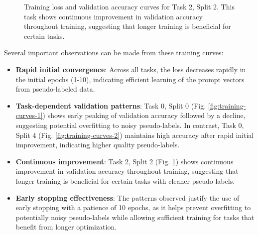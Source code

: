 \documentclass[10pt,conference]{IEEEtran}
\begin{document}
\begin{figure}[!t]
\centering
{}
\caption{Training loss and validation accuracy curves for Task 2, Split 2. This task shows continuous improvement in validation accuracy throughout training, suggesting that longer training is beneficial for certain tasks.}
\label{fig:training-curves-3}
\end{figure}

Several important observations can be made from these training curves:

\begin{itemize}
    \item \textbf{Rapid initial convergence}: Across all tasks, the loss decreases rapidly in the initial epochs (1-10), indicating efficient learning of the prompt vectors from pseudo-labeled data.
    
    \item \textbf{Task-dependent validation patterns}: Task 0, Split 0 (Fig. \ref{fig:training-curves-1}) shows early peaking of validation accuracy followed by a decline, suggesting potential overfitting to noisy pseudo-labels. In contrast, Task 0, Split 4 (Fig. \ref{fig:training-curves-2}) maintains high accuracy after rapid initial improvement, indicating higher quality pseudo-labels.
    
    \item \textbf{Continuous improvement}: Task 2, Split 2 (Fig. \ref{fig:training-curves-3}) shows continuous improvement in validation accuracy throughout training, suggesting that longer training is beneficial for certain tasks with cleaner pseudo-labels.
    
    \item \textbf{Early stopping effectiveness}: The patterns observed justify the use of early stopping with a patience of 10 epochs, as it helps prevent overfitting to potentially noisy pseudo-labels while allowing sufficient training for tasks that benefit from longer optimization.
\end{itemize}
\end{document}
